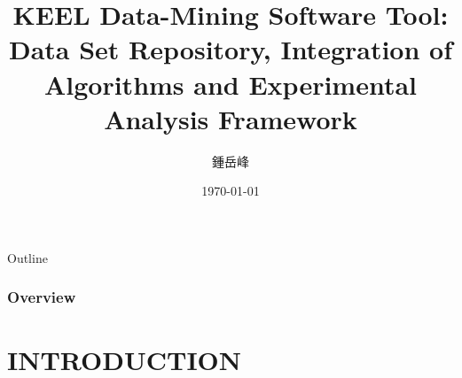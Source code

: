 \documentclass{beamer}
\begin{document}
\begin{CJK*}{UTF8}{bsmi}


\title[KEEL Data-Mining Software Tool]{KEEL Data-Mining Software Tool: Data Set Repository, Integration of Algorithms and Experimental Analysis Framework} %

\author{鍾岳峰} %
\date{\today} %



\begin{frame}
\titlepage %
\end{frame}



\begin{frame}{Outline}
\frametitle{Overview} %

\tableofcontents[hideallsubsections] %
\end{frame}


\section{INTRODUCTION} %



\end{CJK*}
\end{document}
